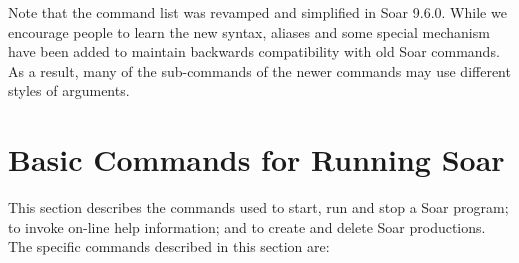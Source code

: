 Note that the command list was revamped and simplified in Soar 9.6.0.  While 
we encourage people to learn the new syntax, aliases and some special mechanism 
have been added to maintain backwards compatibility with old Soar commands.  As a 
result, many of the sub-commands of the newer commands may use different styles of 
arguments.

\section{Basic Commands for Running Soar}
\label{BASIC}

This section describes the commands used to start, run and stop a Soar 
program; to invoke on-line help information; and to create and 
delete Soar productions.  The specific commands described in this
section are:

